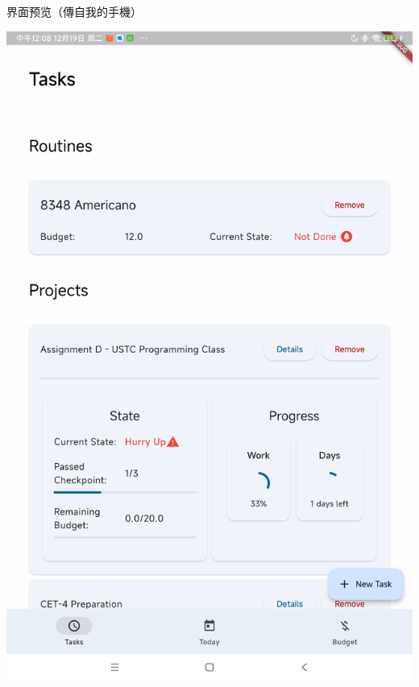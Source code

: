 \documentclass{beamer}
\begin{document}
    \begin{frame}{界面预览（傳自我的手機）}
        \begin{center}
            \begin{minipage}[l]{.45\textwidth}
                \includegraphics[width=.85\textwidth]{page-tasks.jpg}
            \end{minipage}
            \begin{minipage}[r]{.45\textwidth}

\end{minipage}
\end{center}
\end{frame}
\end{document}
